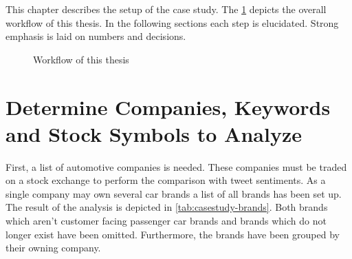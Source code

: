 
This chapter describes the setup of the case study.
The \cref{fig:casestudy-workflow} depicts the overall workflow of this thesis.
In the following sections each step is elucidated.
Strong emphasis is laid on numbers and decisions.

\begin{figure}[ht]
  \centering


  \caption{Workflow of this thesis}
  \label{fig:casestudy-workflow}
\end{figure}

\section{Determine Companies, Keywords and Stock Symbols to Analyze}
\label{s:casestudy-companieskeywords}

First, a list of automotive companies is needed.
These companies must be traded on a stock exchange to perform the comparison with tweet sentiments.
As a single company may own several car brands a list of all brands has been set up.
The result of the analysis is depicted in \cref{tab:casestudy-brands}.
Both brands which aren't customer facing passenger car brands and brands which do not longer exist have been omitted.
Furthermore, the brands have been grouped by their owning company.

